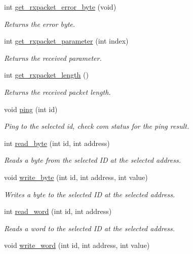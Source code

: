 \begin{DoxyCompactItemize}
int \hyperlink{a00004_a6e62341ef9f51b6e152e769bd7be9d75}{get\+\_\+rxpacket\+\_\+error\+\_\+byte} (void)
\begin{DoxyCompactList}\small\item\em Returns the error byte. \end{DoxyCompactList}\item 
int \hyperlink{a00004_a68b5fa99719a9aec0734ecfb0635503b}{get\+\_\+rxpacket\+\_\+parameter} (int index)
\begin{DoxyCompactList}\small\item\em Returns the received parameter. \end{DoxyCompactList}\item 
int \hyperlink{a00004_ae9cc18fdeda8329f68fa0f2f0a7a9aba}{get\+\_\+rxpacket\+\_\+length} ()
\begin{DoxyCompactList}\small\item\em Returns the received packet length. \end{DoxyCompactList}\item 
void \hyperlink{a00004_af2bd714423e7c4fc089762805c0c71f3}{ping} (int id)
\begin{DoxyCompactList}\small\item\em Ping to the selected id, check com status for the ping result. \end{DoxyCompactList}\item 
int \hyperlink{a00004_a888404b41c4c4395a0b745c77ff2cea9}{read\+\_\+byte} (int id, int address)
\begin{DoxyCompactList}\small\item\em Reads a byte from the selected I\+D at the selected address. \end{DoxyCompactList}\item 
void \hyperlink{a00004_a66c1e32cc45dd46d329f1fc212e46a3d}{write\+\_\+byte} (int id, int address, int value)
\begin{DoxyCompactList}\small\item\em Writes a byte to the selected I\+D at the selected address. \end{DoxyCompactList}\item 
int \hyperlink{a00004_a45e99341e82c5114f6e829c9141bf96f}{read\+\_\+word} (int id, int address)
\begin{DoxyCompactList}\small\item\em Reads a word to the selected I\+D at the selected address. \end{DoxyCompactList}\item 
void \hyperlink{a00004_a925f62ce5e261e5ef4fe6dc46bdc7c63}{write\+\_\+word} (int id, int address, int value)

\end{DoxyCompactItemize}
